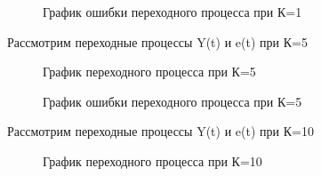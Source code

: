 \documentclass[a4paper, 11pt]{article}
\begin{document}
\newpage

\begin{figure}[h!]
    \caption{График ошибки переходного процесса при К=1}
    \label{tree}
\end{figure}

Рассмотрим переходные процессы Y(t) и e(t) при К=5

\begin{figure}[h!]
    \caption{График переходного процесса при К=5}
    \label{two}
\end{figure}

\begin{figure}[h!]
    \caption{График ошибки переходного процесса при К=5}
    \label{tree}
\end{figure}

\newpage

Рассмотрим переходные процессы Y(t) и e(t) при К=10

\begin{figure}[h!]
    \caption{График переходного процесса при К=10}
    \label{two}
\end{figure}
\end{document}

